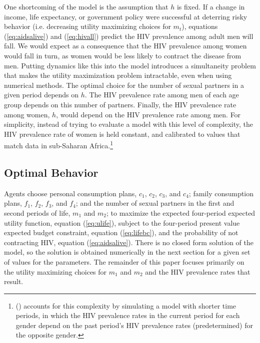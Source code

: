 \documentclass[12pt]{article}
\newcommand{\citee}[1]{\citename{#1} (\citeyear{#1})}
\begin{document}
One shortcoming of the model is the assumption that $h$ is fixed.  If a change in income, life expectancy, or government policy were successful at deterring risky behavior (i.e. decreasing utility maximizing choices for $m_t$), equations (\ref{eq:aidsalive}) and (\ref{eq:hivall}) predict the HIV prevalence among adult men will fall.  We would expect as a consequence that the HIV prevalence among women would fall in turn, as women would be less likely to contract the disease from men. Putting dynamics like this into the model introduces a simultaneity problem that makes the utility maximization problem intractable, even when using numerical methods.  The optimal choice for the number of sexual partners in a given period depends on $h$.  The HIV prevalence rate among men of each age group depends on this number of partners.  Finally, the HIV prevalence rate among women, $h$, would depend on the HIV prevalence rate among men.  For simplicity, instead of trying to evaluate a model with this level of complexity, the HIV prevalence rate of women is held constant, and calibrated to values that match data in sub-Saharan Africa.\footnote{\citee{eoQJE} accounts for this complexity by simulating a model with shorter time periods, in which the HIV prevalence rates in the current period for each gender depend on the past period's HIV prevalence rates (predetermined) for the opposite gender.}

\subsection{Optimal Behavior}
Agents choose personal consumption plans, $c_1$, $c_2$, $c_3$, and $c_4$; family consumption plans, $f_1$, $f_2$, $f_3$, and $f_4$; and the number of sexual partners in the first and second periods of life, $m_1$ and $m_2$; to maximize the expected four-period expected utility function, equation (\ref{eq:ulife}), subject to the four-period present value expected budget constraint, equation (\ref{eq:lifebc}), and the probability of not contracting HIV, equation (\ref{eq:aidsalive}).  There is no closed form solution of the model, so the solution is obtained numerically in the next section for a given set of values for the parameters.  The remainder of this paper focuses primarily on the utility maximizing choices for $m_1$ and $m_2$ and the HIV prevalence rates that result.
\end{document}

